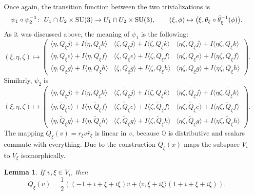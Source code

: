 \documentclass[10pt,a4paper]{amsart}
\numberwithin{equation}{section}
\newtheorem{Lemma}[Theorem]{Lemma}
\newcommand{\SO}{\mathbb{O}} %
\begin{document}
Once again, the transition function between the two trivializations is
\[\psi_1 \circ \psi_2^{-1}\colon \ U_1 \cap U_2 \times {\rm SU}(3) \rightarrow U_1 \cap U_2\times {\rm SU}(3), \qquad (\xi,\phi) \mapsto \big(\xi, \theta_\xi \circ \tilde{\theta}_\xi^{-1}(\phi) \big).\]
As it was discussed above, the meaning of $\psi_1$ is the following:
\[ (\xi,\eta,\zeta) \mapsto
\begin{pmatrix}
\langle \eta,Q_\xi j \rangle + I\langle \eta, Q_\xi k \rangle & \langle \zeta, Q_\xi j \rangle + I\langle \zeta, Q_\xi k \rangle & \langle \eta \zeta, Q_\xi j \rangle + I\langle \eta \zeta,Q_\xi k \rangle\\
\langle \eta,Q_\xi e \rangle +I\langle \eta,Q_\xi f \rangle & \langle \zeta,Q_\xi e \rangle +I\langle \zeta,Q_\xi f \rangle & \langle \eta \zeta,Q_\xi e \rangle +I\langle \eta \zeta,Q_\xi f \rangle\\
\langle \eta,Q_\xi g \rangle +I\langle \eta,Q_\xi h \rangle & \langle \zeta,Q_\xi g \rangle +I\langle \zeta,Q_\xi h \rangle & \langle \eta \zeta,Q_\xi g \rangle +I\langle \eta \zeta,Q_\xi h \rangle
\end{pmatrix}.
\]
Similarly, $\psi_2$ is
\[ (\xi,\eta,\zeta) \mapsto
\begin{pmatrix}
\langle \eta,\tilde{Q}_\xi j \rangle + I\langle \eta, \tilde{Q}_\xi k \rangle & \langle \zeta, \tilde{Q}_\xi j \rangle + I\langle \zeta, \tilde{Q}_\xi k \rangle & \langle \eta \zeta, \tilde{Q}_\xi j \rangle + I\langle \eta \zeta,\tilde{Q}_\xi k \rangle\\
\langle \eta,\tilde{Q}_\xi e \rangle +I\langle \eta,\tilde{Q}_\xi f \rangle & \langle \zeta,\tilde{Q}_\xi e \rangle +I\langle \zeta,\tilde{Q}_\xi f \rangle & \langle \eta \zeta,\tilde{Q}_\xi e \rangle +I\langle \eta \zeta,\tilde{Q}_\xi f \rangle\\
\langle \eta,\tilde{Q}_\xi g \rangle +I\langle \eta,\tilde{Q}_\xi h \rangle & \langle \zeta,\tilde{Q}_\xi g \rangle +I\langle \zeta,\tilde{Q}_\xi h \rangle & \langle \eta \zeta,\tilde{Q}_\xi g \rangle +I\langle \eta \zeta,\tilde{Q}_\xi h \rangle
\end{pmatrix}.
\]
The mapping $Q_\xi(v)= r_\xi v\bar{r}_\xi$ is linear in $v$, because $\SO$ is distributive and scalars commute with everything. Due to the construction $Q_\xi(x)$ maps the subspace $V_i$ to $V_\xi$ isomorphically.
\begin{Lemma} \label{lem:gxiv} If $v, \xi \in V_i$, then
 \[ Q_\xi(v)= \frac{1}{2}((-1+i+\xi+i\xi) v + \langle v, \xi + i\xi \rangle (1+i+\xi+i\xi)). \]
\end{Lemma}
\end{document}
